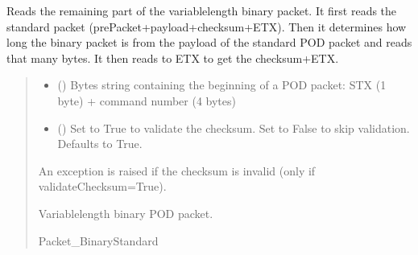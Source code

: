\documentclass[letterpaper,10pt,english]{sphinxmanual}
\begin{document}
\begin{fulllineitems}
\begin{fulllineitems}
\label{\detokenize{PodApi.Devices:PodApi.Devices.PodDevice_8274D.Pod8274D._Read_Binary}}
\pysigstartsignatures
{}
\pysigstopsignatures
\sphinxAtStartPar
Reads the remaining part of the variable\sphinxhyphen{}length binary packet. It first reads the standard         packet (prePacket+payload+checksum+ETX). Then it determines how long the binary packet is from the         payload of the standard POD packet and reads that many bytes. It then reads to ETX to get the         checksum+ETX.
\begin{quote}\begin{description}
\begin{itemize}
\item {} 
\sphinxAtStartPar
{} () \textendash{} Bytes string containing the beginning of a POD packet: STX (1 byte)                 + command number (4 bytes)

\item {} 
\sphinxAtStartPar
{} (\sphinxstyleliteralemphasis{\sphinxupquote{, }}) \textendash{} Set to True to validate the checksum. Set to False to                 skip validation. Defaults to True.

\end{itemize}

\sphinxAtStartPar
{} \textendash{} An exception is raised if the checksum is invalid (only if validateChecksum=True).

\sphinxAtStartPar
Variable\sphinxhyphen{}length binary POD packet.

\sphinxAtStartPar
Packet\_BinaryStandard

\end{description}\end{quote}

\end{fulllineitems}


\end{fulllineitems}
\end{document}
